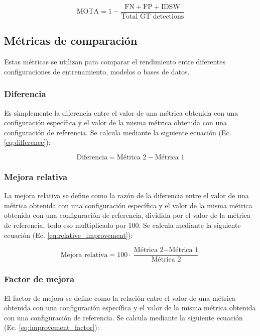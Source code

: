 \begin{equation}
\text{MOTA} = 1 - \dfrac{\text{FN} + \text{FP} + \text{IDSW}}{\text{Total GT detections}}
\label{eq:mota}
\end{equation}

\subsection{Métricas de comparación}
Estas métricas se utilizan para comparar el rendimiento entre diferentes configuraciones de entrenamiento, modelos o bases de datos.

\subsubsection{Diferencia}
Es simplemente la diferencia entre el valor de una métrica obtenida con una configuración específica y el valor de la misma métrica obtenida con una configuración de referencia. Se calcula mediante la siguiente ecuación (Ec. \ref{eq:difference}):

\begin{equation}
  \text{Diferencia} = \text{Métrica 2} - \text{Métrica 1}
  \label{eq:difference}
\end{equation}

\subsubsection{Mejora relativa}
La mejora relativa se define como la razón de la diferencia entre el valor de una métrica obtenida con una configuración específica y el valor de la misma métrica obtenida con una configuración de referencia, dividida por el valor de la métrica de referencia, todo eso multiplicado por 100. Se calcula mediante la siguiente ecuación (Ec. \ref{eq:relative_improvement}):

\begin{equation}
  \text{Mejora relativa} = 100 \cdot \dfrac{\text{Métrica 2} - \text{Métrica 1}}{\text{Métrica 2}}
  \label{eq:relative_improvement}
\end{equation}

\subsubsection{Factor de mejora}
El factor de mejora se define como la relación entre el valor de una métrica obtenida con una configuración específica y el valor de la misma métrica obtenida con una configuración de referencia. Se calcula mediante la siguiente ecuación (Ec. \ref{eq:improvement_factor}):

